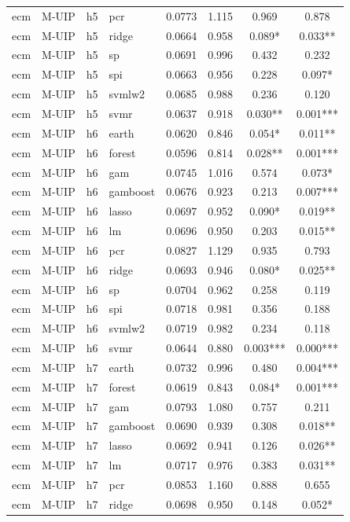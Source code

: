 \begin{ThreePartTable}
\begin{longtable}[t]{llclcccc}
ecm & M-UIP & h5 & pcr & 0.0773 & 1.115 & 0.969 & 0.878\\
ecm & M-UIP & h5 & ridge & 0.0664 & 0.958 & 0.089* & 0.033**\\
ecm & M-UIP & h5 & sp & 0.0691 & 0.996 & 0.432 & 0.232\\
ecm & M-UIP & h5 & spi & 0.0663 & 0.956 & 0.228 & 0.097*\\
ecm & M-UIP & h5 & svmlw2 & 0.0685 & 0.988 & 0.236 & 0.120\\
ecm & M-UIP & h5 & svmr & 0.0637 & 0.918 & 0.030** & 0.001***\\
\addlinespace
ecm & M-UIP & h6 & earth & 0.0620 & 0.846 & 0.054* & 0.011**\\
ecm & M-UIP & h6 & forest & 0.0596 & 0.814 & 0.028** & 0.001***\\
ecm & M-UIP & h6 & gam & 0.0745 & 1.016 & 0.574 & 0.073*\\
ecm & M-UIP & h6 & gamboost & 0.0676 & 0.923 & 0.213 & 0.007***\\
ecm & M-UIP & h6 & lasso & 0.0697 & 0.952 & 0.090* & 0.019**\\
ecm & M-UIP & h6 & lm & 0.0696 & 0.950 & 0.203 & 0.015**\\
ecm & M-UIP & h6 & pcr & 0.0827 & 1.129 & 0.935 & 0.793\\
ecm & M-UIP & h6 & ridge & 0.0693 & 0.946 & 0.080* & 0.025**\\
ecm & M-UIP & h6 & sp & 0.0704 & 0.962 & 0.258 & 0.119\\
ecm & M-UIP & h6 & spi & 0.0718 & 0.981 & 0.356 & 0.188\\
ecm & M-UIP & h6 & svmlw2 & 0.0719 & 0.982 & 0.234 & 0.118\\
ecm & M-UIP & h6 & svmr & 0.0644 & 0.880 & 0.003*** & 0.000***\\
\addlinespace
ecm & M-UIP & h7 & earth & 0.0732 & 0.996 & 0.480 & 0.004***\\
ecm & M-UIP & h7 & forest & 0.0619 & 0.843 & 0.084* & 0.001***\\
ecm & M-UIP & h7 & gam & 0.0793 & 1.080 & 0.757 & 0.211\\
ecm & M-UIP & h7 & gamboost & 0.0690 & 0.939 & 0.308 & 0.018**\\
ecm & M-UIP & h7 & lasso & 0.0692 & 0.941 & 0.126 & 0.026**\\
ecm & M-UIP & h7 & lm & 0.0717 & 0.976 & 0.383 & 0.031**\\
ecm & M-UIP & h7 & pcr & 0.0853 & 1.160 & 0.888 & 0.655\\
ecm & M-UIP & h7 & ridge & 0.0698 & 0.950 & 0.148 & 0.052*\\

\end{longtable}
\end{ThreePartTable}
